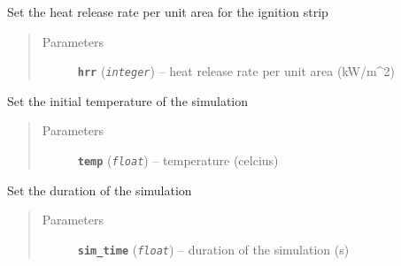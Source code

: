 \documentclass[letterpaper,10pt,english]{sphinxmanual}
\begin{document}
\begin{fulllineitems}
\begin{fulllineitems}
\begin{quote}
\begin{description}
\end{description}\end{quote}

\end{fulllineitems}


\begin{fulllineitems}
\label{wfds_WFDS:wfds.WFDS.set_hrrpua}
Set the heat release rate per unit area for the ignition strip
\begin{quote}\begin{description}
\item[{Parameters}] \leavevmode
\textbf{\texttt{hrr}} (\emph{\texttt{integer}}) -- heat release rate per unit area (kW/m\textasciicircum{}2)

\end{description}\end{quote}

\end{fulllineitems}


\begin{fulllineitems}
\label{wfds_WFDS:wfds.WFDS.set_init_temp}
Set the initial temperature of the simulation
\begin{quote}\begin{description}
\item[{Parameters}] \leavevmode
\textbf{\texttt{temp}} (\emph{\texttt{float}}) -- temperature (celcius)

\end{description}\end{quote}

\end{fulllineitems}


\begin{fulllineitems}
\label{wfds_WFDS:wfds.WFDS.set_run_name}
\end{fulllineitems}


\begin{fulllineitems}
\label{wfds_WFDS:wfds.WFDS.set_simulation_time}
Set the duration of the simulation
\begin{quote}\begin{description}
\item[{Parameters}] \leavevmode
\textbf{\texttt{sim\_time}} (\emph{\texttt{float}}) -- duration of the simulation (s)


\end{description}
\end{quote}
\end{fulllineitems}
\end{fulllineitems}
\end{document}
